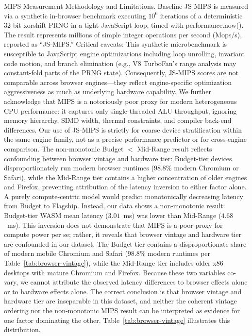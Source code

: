 \documentclass[11pt,a4paper]{article}
\def\textbf#1{#1}%
\def\texttt#1{#1}%
\def\emph#1{#1}%
\begin{document}
\textbf{MIPS Measurement Methodology and Limitations.} Baseline JS MIPS is measured via a synthetic in-browser benchmark executing $10^6$ iterations of a deterministic 32-bit xorshift PRNG in a tight JavaScript loop, timed with \texttt{performance.now()}. The result represents millions of simple integer operations per second (Mops/s), reported as ``JS-MIPS.'' \textbf{Critical caveats}: This synthetic microbenchmark is susceptible to JavaScript engine optimizations including loop unrolling, invariant code motion, and branch elimination (e.g., V8 TurboFan's range analysis may constant-fold parts of the PRNG state). Consequently, JS-MIPS scores are \emph{not comparable across browser engines}---they reflect engine-specific optimization aggressiveness as much as underlying hardware capability. We further acknowledge that MIPS is a notoriously poor proxy for modern heterogeneous CPU performance: it captures only single-threaded ALU throughput, ignoring memory hierarchy, SIMD width, thermal constraints, and compiler back-end differences. Our use of JS-MIPS is strictly for coarse device stratification within the \emph{same} engine family, not as a precise performance predictor or for cross-engine comparison. \textbf{The non-monotonic Budget $<$ Mid-Range result reflects confounding between browser vintage and hardware tier}: Budget-tier devices disproportionately run modern browser runtimes (98.8\% modern Chromium or Safari), while the Mid-Range tier contains a higher concentration of older engines and Firefox, preventing attribution of the latency inversion to either factor alone. A purely compute-centric model would predict monotonically decreasing latency from Budget to Flagship. Instead, our data shows a non-monotonic result: Budget-tier WASM mean latency ($3.01$~ms) was lower than Mid-Range ($4.68$~ms). This inversion does not demonstrate that MIPS is a poor proxy for compute power per se; rather, it reveals that browser vintage and hardware tier are confounded in our dataset. The Budget tier contains a disproportionate share of modern mobile Chromium and Safari (98.8\% modern runtimes per Table~\ref{tab:browser-vintage}), while the Mid-Range tier includes older x86 desktops with mature Chromium and Firefox. Because these two variables co-vary, we cannot attribute the observed latency differences to browser effects alone or to hardware effects alone. The correct conclusion is that browser vintage and hardware tier are inseparable in this dataset, and neither the coherent vintage ordering nor the non-monotonic MIPS result can be interpreted as evidence for one factor dominating the other. Table~\ref{tab:browser-vintage} illustrates this distribution.
\end{document}
